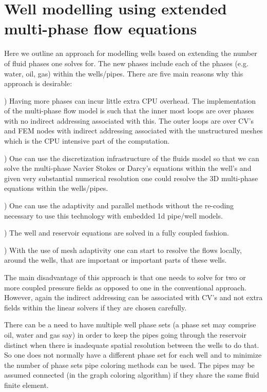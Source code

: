\pagebreak





\section{Well modelling using extended multi-phase flow equations} 
\label{Well modelling using extended multi-phase flow equations}
Here we outline an approach for modelling wells based on extending the number of 
fluid phases one solves for. The new phases include each of the phases (e.g. water, oil, gas) 
within the wells/pipes. There are five main reasons why this approach is desirable:
\par{}) Having more phases can incur little extra CPU overhead. 
The implementation of the multi-phase flow model is such that the inner most loops 
are over phases with no indirect addressing associated with this. The outer loops 
are over CV's and FEM nodes with indirect addressing associated with the unstructured meshes 
which is the CPU intensive part of the 
computation.  
\par{}) One can use the discretization infrastructure of the fluids model so that we can solve the 
multi-phase 
Navier Stokes or Darcy's equations within the well's and given very substantial numerical 
resolution one could resolve the 3D multi-phase equations within the wells/pipes. 
\par{}) One can use the adaptivity and parallel methods without the re-coding necessary 
to use this technology with embedded 1d pipe/well models. 
\par{}) The well and reservoir equations are solved in a fully coupled fashion. 
\par{}) With the use of mesh adaptivity one can start to resolve the flows locally, around the 
wells, that are important or important parts of these wells.   

The main disadvantage of this approach is that one needs to solve for two or more 
coupled pressure fields as opposed to one in the conventional approach. 
However, again the indirect addressing can be associated with CV's and not 
extra fields within the linear solvers if they are chosen carefully.   

There can be a need to have multiple well phase sets (a phase set may comprise oil, water and gas say) 
in order to keep the 
pipes going through the reservoir distinct when there is inadequate spatial resolution 
between the wells to do that. So one does not normally have a different phase set for each well and to minimize the 
number of phase sets pipe coloring methods can be used. The pipes may be assumed connected (in the graph coloring algorithm) if they share the same fluid finite element. 


